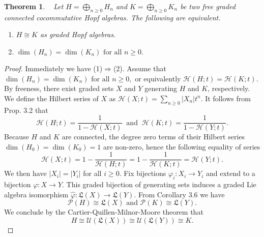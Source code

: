 \documentclass[11pt]{amsart}
\newtheorem{thm}{Theorem}
\theoremstyle{definition}
\numberwithin{equation}{section}
\begin{document}
\begin{thm}~\cite[Theorem 4.2]{AT22}
Let $H=\bigoplus_{n\geq 0} H_n$ and $K=\bigoplus_{n\geq 0} K_n$ be two free graded connected cocommutative Hopf algebras. The following are equivalent.
\begin{enumerate}
\item $H\cong K$ as graded Hopf algebras. 

\item $\dim(H_n)=\dim(K_n) \text{ for all } n\geq 0.$
\end{enumerate}   
\end{thm}

\begin{proof}
Immediately we have (1)$\Rightarrow$(2). Assume that $\dim(H_n)=\dim(K_n) \text{ for all } n\geq 0,$ or equivalently $\mathcal{H}(H;t)=\mathcal{H}(K;t).$ By freeness, there exist graded sets $X$ and $Y$ generating $H$ and $K$, respectively. We define the Hilbert series of $X$ as $\mathcal{H}(X;t)=\sum_{n\geq 0}|X_n|t^n$. It follows from Prop. 3.2 that
\[
\mathcal{H}(H;t)=\frac{1}{1-\mathcal{H}(X;t)}\ \text{  and  }\ \mathcal{H}(K;t)=\frac{1}{1-\mathcal{H}(Y;t)}.
\]
Because $H$ and $K$ are connected, the degree zero terms of their Hilbert series $\dim(H_0)=\dim(K_0)=1$ are non-zero, hence the following equality of series
\[
\mathcal{H}(X;t)=1-\frac{1}{\mathcal{H}(H;t)}=1-\frac{1}{\mathcal{H}(K;t)}=\mathcal{H}(Y;t).
\]
We then have $|X_i|=|Y_i|$ for all $i\geq 0.$ Fix bijections $\varphi_i:X_i\to Y_i$ and extend to a bijection $\varphi:X\to Y$. This graded bijection of generating sets induces a graded Lie algebra isomorphism $\hat{\varphi}:\mathfrak{L}(X)\to \mathfrak{L}(Y)$. From Corollary 3.6 we have 
\[
\mathcal{P}(H)\cong \mathfrak{L}(X) \text{ and } \mathcal{P}(K)\cong \mathfrak{L}(Y).
\]
We conclude by the Cartier-Quillen-Milnor-Moore theorem that
\[
H\cong \mathcal{U}(\mathfrak{L}(X))\cong \mathcal{U}(\mathfrak{L}(Y))\cong K.
\]
\end{proof}
\end{document}
